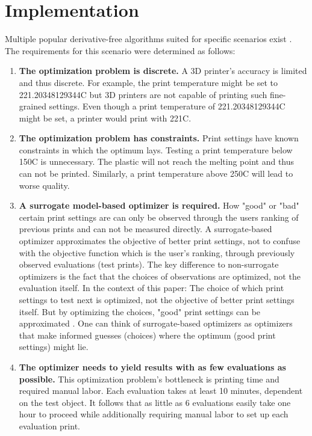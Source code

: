 \section{Implementation}
Multiple popular derivative-free algorithms suited for specific scenarios exist \cite{rios2013derivative, paraskevoudis2020real, nevergrad}. The requirements for this scenario were determined as follows: 

\begin{enumerate}
    \item \textbf{The optimization problem is discrete.} A 3D printer's accuracy is limited and thus discrete. For example, the print temperature might be set to 221.20348129344\textdegree C but 3D printers are not capable of printing such fine-grained settings. Even though a print temperature of 221.20348129344\textdegree C might be set, a printer would print with 221\textdegree C.
    \item \textbf{The optimization problem has constraints.} Print settings have known constraints in which the optimum lays. Testing a print temperature below 150\textdegree C is unnecessary. The plastic will not reach the melting point and thus can not be printed. Similarly, a print temperature above 250\textdegree C will lead to worse quality.
    \item \textbf{A surrogate model-based optimizer is required.} How "good" or "bad" certain print settings are can only be observed through the users ranking of previous prints and can not be measured directly. A surrogate-based optimizer approximates the objective of better print settings, not to confuse with the objective function which is the user's ranking, through previously observed evaluations (test prints)\cite{karlsson2020continuous, molnar2019}. The key difference to non-surrogate optimizers is the fact that the choices of observations are optimized, not the evaluation itself. In the context of this paper: The choice of which print settings to test next is optimized, not the objective of better print settings itself. But by optimizing the choices, "good" print settings can be approximated \cite{molnar2019}. One can think of surrogate-based optimizers as optimizers that make informed guesses (choices) where the optimum (good print settings) might lie.  
    \item \textbf{The optimizer needs to yield results with as few evaluations as possible.} This optimization problem's bottleneck is printing time and required manual labor. Each evaluation takes at least 10 minutes, dependent on the test object. It follows that as little as 6 evaluations easily take one hour to proceed while additionally requiring manual labor to set up each evaluation print. 
\end{enumerate}

